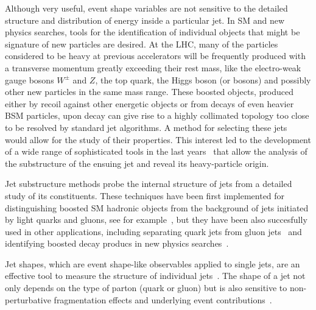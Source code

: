 Although very useful, event shape variables are not sensitive to the detailed structure and distribution of energy inside a particular jet. In SM and new physics searches, tools for the identification of individual objects that might be signature of new particles are desired. 
At the LHC, many of the particles considered to be heavy at previous accelerators will be frequently produced with a transverse momentum greatly exceeding their rest mass, like the electro-weak gauge bosons $W^\pm$ and $Z$, the top quark, the Higgs boson (or bosons) and possibly other new particles in the same mass range. These boosted objects, produced either by recoil against other energetic objects or from decays of even heavier BSM particles, upon decay can give rise to a highly collimated topology too close to be resolved by standard jet algorithms. 
A method for selecting these jets would allow for the study of their properties.   This interest led to the development of a wide range of %
sophisticated tools in the last years~\cite{boost2010,boost2010b} that allow the analysis of the substructure of the ensuing jet and reveal its heavy-particle origin.

  Jet substructure methods probe the internal structure of jets from a detailed study of its constituents. These techniques have been first implemented for distinguishing boosted SM hadronic objects from the background of jets initiated by light quarks and gluons, see for example~\cite{ATLASBoostedHbb},
but they have been also succesfully used in other applications, including separating quark jets from gluon jets~\cite{PhysRevLett.107.172001} and identifying boosted decay producs in new physics searches~\cite{PhysRevD.82.095012}.

Jet shapes, which are event shape-like observables applied to single jets, are an effective tool to measure the structure of individual jets~\cite{springerlink:10.1007/JHEP11(2010)101}.%
 The shape of a jet not only depends on the type of parton (quark or gluon) but is also sensitive to non-perturbative fragmentation effects and underlying event contributions~\cite{ATLASJetShapes}.


